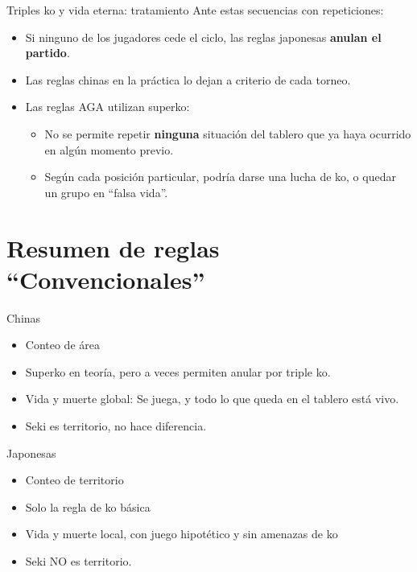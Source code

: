 \documentclass{beamer}
\begin{document}
\begin{frame}{Triples ko y vida eterna: tratamiento}
    Ante estas secuencias con repeticiones:
    
    \begin{itemize}
        \item Si ninguno de los jugadores cede el ciclo, las reglas japonesas \textbf{anulan el partido}.
        \item Las reglas chinas en la práctica lo dejan a criterio de cada torneo.
        \item Las reglas AGA utilizan superko:
        \begin{itemize}
          \item No se permite repetir \textbf{ninguna} situación del tablero que ya haya ocurrido en algún momento previo.
          \item Según cada posición particular, podría darse una lucha de ko, o quedar un grupo en ``falsa vida''.
        \end{itemize}
        
    \end{itemize}
\end{frame}

\section{Resumen de reglas ``Convencionales''}

\begin{frame}{Chinas}
    \begin{itemize}
        \item Conteo de área
        \item Superko en teoría, pero a veces permiten anular por triple ko.
        \item Vida y muerte global: Se juega, y todo lo que queda en el tablero está vivo.
        \item Seki es territorio, no hace diferencia.
    \end{itemize}
\end{frame}

\begin{frame}{Japonesas}
    \begin{itemize}
        \item Conteo de territorio
        \item Solo la regla de ko básica
        \item Vida y muerte local, con juego hipotético y sin amenazas de ko
        \item Seki NO es territorio.
    \end{itemize}
\end{frame}
\end{document}
